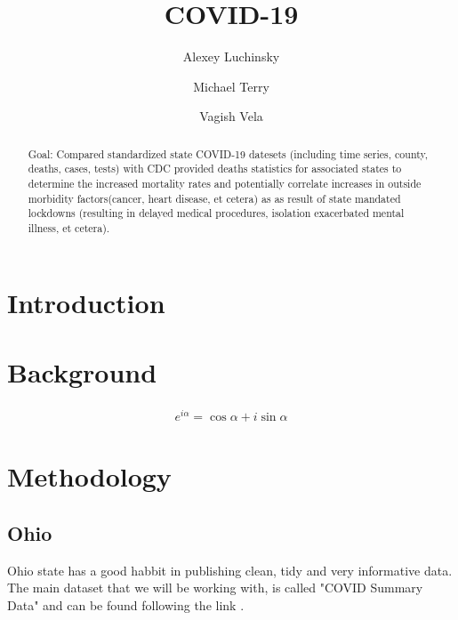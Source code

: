 \documentclass[conference]{IEEEtran}
\begin{document}
\title{COVID-19}
\author{Alexey Luchinsky \and Michael Terry  \and Vagish Vela}
\maketitle

\begin{abstract}
Goal: Compared standardized state COVID-19 datesets (including time series, county, deaths, cases, tests) with CDC provided deaths statistics for associated states to determine the increased mortality rates and potentially correlate increases in outside morbidity factors(cancer, heart disease, et cetera) as as result of state mandated lockdowns (resulting in delayed medical procedures, isolation exacerbated mental illness, et cetera).
  \blindtext
\end{abstract}

\section{Introduction}

\blindtext

\blindtext

\section{Background}

\blindtext 

\begin{eqnarray}
  \label{eq:1}
  e^{i\alpha} = \cos\alpha + i \sin\alpha
\end{eqnarray}

\blindtext 

\blindtext 

\section{Methodology}

\subsection{Ohio}
\label{Ohio}

Ohio state has a good habbit in publishing clean, tidy and very informative data. The main dataset that we will be working with, is called "COVID Summary Data" and can be found following the link \cite{system_covid-19_nodate}.
\end{document}
